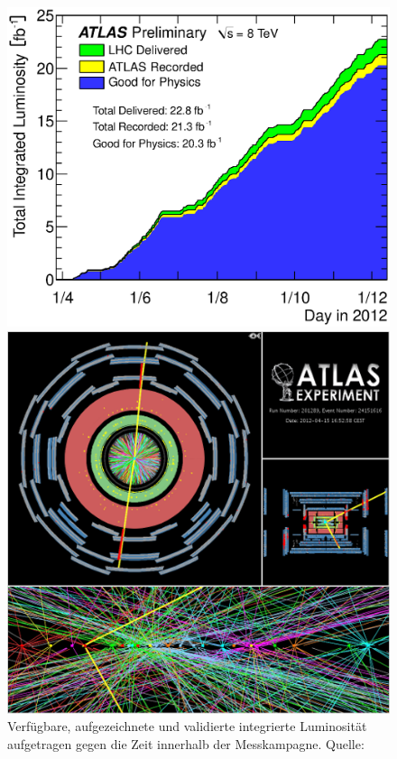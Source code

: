 \begin{figure}
    \begin{minipage}[b]{0.48\textwidth}
        \centering
        \includegraphics[width=1.\textwidth]{plots/lumi}
        \captionsetup{format=plain}
        \caption[Verfügbare, aufgezeichnete und validierte integrierte
            Luminosität aufgetragen gegen die Zeit]
            {Verfügbare, aufgezeichnete und validierte integrierte
            Luminosität aufgetragen gegen die Zeit innerhalb der Messkampagne.
            Quelle: \cite{ATLAS:Public}}
        \label{fig:lumi}
    \end{minipage}
    \hfill
    \begin{minipage}[b]{0.48\textwidth}
        \centering
        \includegraphics[width=1.\textwidth]{img/pileup}

\end{minipage}
\end{figure}
